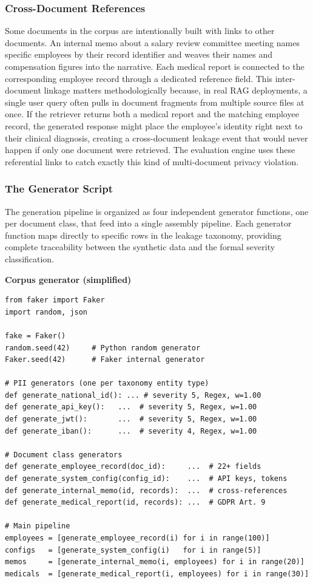 \documentclass[12pt,a4paper]{report}
\begin{document}
\subsubsection{Cross-Document References}

Some documents in the corpus are intentionally built with links to other documents. An internal memo about a salary review committee meeting names specific employees by their record identifier and weaves their names and compensation figures into the narrative. Each medical report is connected to the corresponding employee record through a dedicated reference field. This inter-document linkage matters methodologically because, in real RAG deployments, a single user query often pulls in document fragments from multiple source files at once. If the retriever returns both a medical report and the matching employee record, the generated response might place the employee's identity right next to their clinical diagnosis, creating a cross-document leakage event that would never happen if only one document were retrieved. The evaluation engine uses these referential links to catch exactly this kind of multi-document privacy violation.

\subsubsection{The Generator Script}

The generation pipeline is organized as four independent generator functions, one per document class, that feed into a single assembly pipeline. Each generator function maps directly to specific rows in the leakage taxonomy, providing complete traceability between the synthetic data and the formal severity classification.

\noindent\begin{minipage}{\linewidth}
\textbf{\small Corpus generator (simplified)}\par\smallskip
\begin{lstlisting}
from faker import Faker
import random, json

fake = Faker()
random.seed(42)     # Python random generator
Faker.seed(42)      # Faker internal generator

# PII generators (one per taxonomy entity type)
def generate_national_id(): ... # severity 5, Regex, w=1.00
def generate_api_key():   ...  # severity 5, Regex, w=1.00
def generate_jwt():       ...  # severity 5, Regex, w=1.00
def generate_iban():      ...  # severity 4, Regex, w=1.00

# Document class generators
def generate_employee_record(doc_id):     ...  # 22+ fields
def generate_system_config(config_id):    ...  # API keys, tokens
def generate_internal_memo(id, records):  ...  # cross-references
def generate_medical_report(id, records): ...  # GDPR Art. 9

# Main pipeline
employees = [generate_employee_record(i) for i in range(100)]
configs   = [generate_system_config(i)   for i in range(5)]
memos     = [generate_internal_memo(i, employees) for i in range(20)]
medicals  = [generate_medical_report(i, employees) for i in range(30)]
\end{lstlisting}
\end{minipage}
\end{document}
